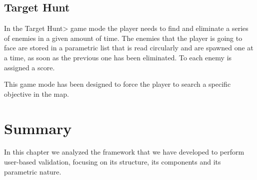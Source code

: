\subsection{Target Hunt}

In the \<Target Hunt> game mode the player needs to find and eliminate a series of enemies in a given amount of time. The  enemies that the player is going to face are stored in a parametric list that is read circularly and are spawned one at a time, as soon as the previous one has been eliminated. To each enemy is assigned a score.

\par

This game mode has been designed to force the player to search a specific objective in the map.

\section{Summary}

In this chapter we analyzed the framework that we have developed to perform user-based validation, focusing on its structure, its components and its parametric nature.